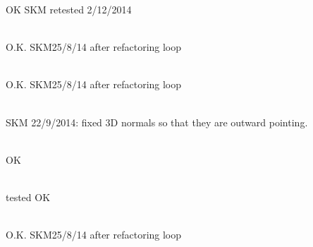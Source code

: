 \begin{DoxyRefList}
\label{test__test000032}%
%
OK SKM retested 2/12/2014  
\item[Member \doxylink{classcsmp_1_1_element_a0d60cba1686c6e0eddfb3e279407c3f1}{csmp\+::Element\texorpdfstring{$<$}{<} dim \texorpdfstring{$>$}{>}\+::Bary\+Center} () const]\hfill \\
\label{test__test000045}%
%
O.\+K. SKM25/8/14 after refactoring loop 
\item[Member \doxylink{classcsmp_1_1_face_abba92cf6bcc806c08668aa9cede84380}{csmp\+::Face\texorpdfstring{$<$}{<} dim \texorpdfstring{$>$}{>}\+::Bary\+Center} () const]\hfill \\
\label{test__test000046}%
%
O.\+K. SKM25/8/14 after refactoring loop 
\item[Member \doxylink{classcsmp_1_1_finite_element_policy_a202387b7bb52a9ff75f00ae354ba8ef2}{csmp\+::Finite\+Element\+Policy\texorpdfstring{$<$}{<} dim, CELL \texorpdfstring{$>$}{>}\+::Unit\+Normal\+To\+Face} (uint32\+\_\+t face) const]\hfill \\
\label{test__test000004}%
%
SKM 22/9/2014\+: fixed 3D normals so that they are outward pointing. 
\item[Member \doxylink{namespacecsmp_a13b5d55bb94700f5ade9c043610c14f5}{csmp\+::friction\+Angle} (double friction\+\_\+coeff)]\hfill \\
\label{test__test000075}%
%
OK  
\item[Member \doxylink{classcsmp_1_1_generic_node_property_gradient_a0d39897acf8b9ce920b9cbca076fc8e8}{csmp\+::Generic\+Node\+Property\+Gradient\texorpdfstring{$<$}{<} dim \texorpdfstring{$>$}{>}\+::Calculate\+Generic\+Nodal\+Gradient} ()]\hfill \\
\label{test__test000026}%
%
tested OK  
\item[Member \doxylink{classcsmp_1_1_inter_face_aeeda11db11cfac3e9de963c892d4fb3c}{csmp\+::Inter\+Face\texorpdfstring{$<$}{<} dim \texorpdfstring{$>$}{>}\+::Bary\+Center} () const]\hfill \\
\label{test__test000047}%
%
O.\+K. SKM25/8/14 after refactoring loop 
\item[Member \doxylink{group___c_s_m_pglobal_functions_gafab769328f91ebe6032499c43faa8110}{csmp\+::is\+BACK} (\doxylink{group___c_s_m_pglobal_enums_ga8e4421c3cd02f67e535bceb2dc74bfb6}{BOX\+\_\+\+BOUNDARY})]\hfill \\

\end{DoxyRefList}
